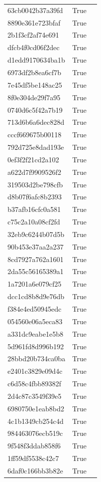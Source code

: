 \begin{tabular}{lrl}
63cb0042b37a39fd & True &  \\
8890e361e723bfaf & True &  \\
2b1f3cf2af74e691 & True &  \\
dfcb4f0cd06f2dec & True &  \\
d1edd9170634ba1b & True &  \\
6973df2b8ea6cf7b & True &  \\
7e45df5be148ac25 & True &  \\
8f0e304de29f7a95 & True &  \\
0740d6c5f42a7b19 & True &  \\
713d6b6a6dec828d & True &  \\
cccf669675b00118 & True &  \\
792d725e8dad193e & True &  \\
0ef3f2f21cd2a102 & True &  \\
a622d7f9909526f2 & True &  \\
319503d2be798cfb & True &  \\
d8b07f6afc8b2393 & True &  \\
b37afb16cfc0a581 & True &  \\
c75c2a10a08cf2fd & True &  \\
32eb9c6244b07d5b & True &  \\
90b453e37aa2a237 & True &  \\
8cd7927a762a1601 & True &  \\
2da55c56165389a1 & True &  \\
1a7201a6e079cf25 & True &  \\
dcc1cd8b8d9e76db & True &  \\
f384e4ed50945edc & True &  \\
054560e06a5eca83 & True &  \\
a331dc9eabe1e5b8 & True &  \\
5d961fd8d996b192 & True &  \\
28bbd20b734ca0ba & True &  \\
e2401c3829e09d4c & True &  \\
c6d58c4fbb89382f & True &  \\
2d4c87c3549f39e5 & True &  \\
6980750e1eab8bd2 & True &  \\
4c1b1349cb254c4d & True &  \\
984463076ecb519c & True &  \\
9f548f3ddab858f6 & True &  \\
1ff59df5538c42c7 & True &  \\
6daf0c166bb3b82e & True &  \\

\end{tabular}
